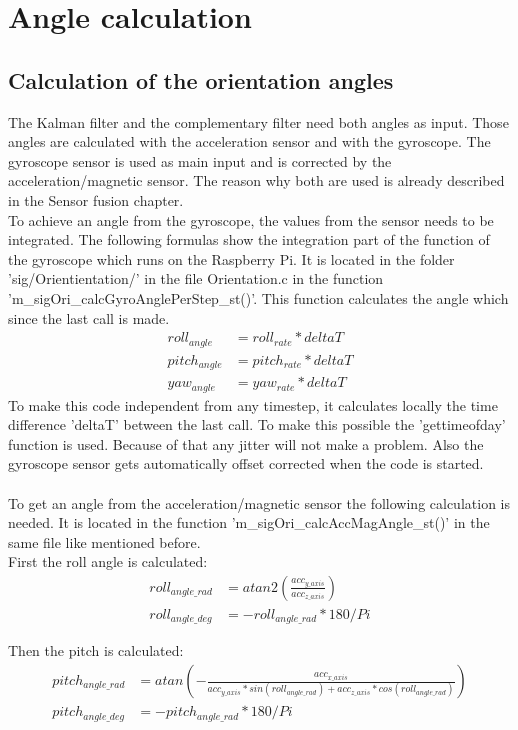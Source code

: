 \chapter{Angle calculation}
\label{chap:angle}

\section{Calculation of the orientation angles}
\label{sec:CalcAngle}
The Kalman filter and the complementary filter need both angles as input. Those angles are calculated with the acceleration sensor and with the gyroscope. The gyroscope sensor is used as main input and is corrected by the acceleration/magnetic sensor. The reason why both are used is already described in the Sensor fusion chapter.\\
To achieve an angle from the gyroscope, the values from the sensor needs to be integrated. The following formulas show the integration part of the function of the gyroscope which runs on the Raspberry Pi. It is located in the folder 'sig/Orientientation/' in the file Orientation.c in the function 'm\_sigOri\_calcGyroAnglePerStep\_st()'. This function calculates the angle which since the last call is made.
\begin{align}
roll_{angle}&=roll_{rate}*deltaT\\
pitch_{angle}&=pitch_{rate}*deltaT\\
yaw_{angle}&=yaw_{rate}*deltaT
\end{align}
To make this code independent from any timestep, it calculates locally the time difference 'deltaT' between the last call. To make this possible the 'gettimeofday' function is used. Because of that any jitter will not make a problem. Also the gyroscope sensor gets automatically offset corrected when the code is started.\\\\
To get an angle from the acceleration/magnetic sensor the following calculation is needed. It is located in the function 'm\_sigOri\_calcAccMagAngle\_st()' in the same file like mentioned before.\\
First the roll angle is calculated:
\begin{align}
roll_{angle\_rad}&=atan2\left(\frac{acc_{y\_axis}}{acc_{z\_axis}}\right)\\
		roll_{angle\_deg}&=-roll_{angle\_rad}*180/Pi
\end{align}

Then the pitch is calculated:
\begin{align}
pitch_{angle\_rad}&=atan\left(-\frac{acc_{x\_axis}}{acc_{y\_axis}*sin(roll_{angle\_rad})+acc_{z\_axis}*cos(roll_{angle\_rad})}\right)\\
pitch_{angle\_deg}&=-pitch_{angle\_rad}*180/Pi
\end{align}

